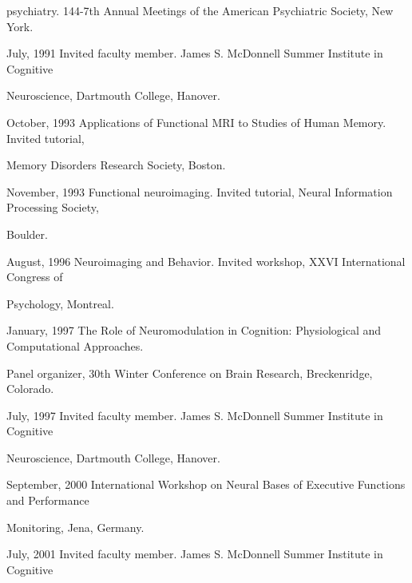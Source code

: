 \documentclass[10 pt]{article}
\begin{document}
\hspace{1.1in} psychiatry. 144-7th Annual Meetings of the American Psychiatric Society, New York.

July, 1991 \hspace{0.44in} Invited faculty member. James S. McDonnell Summer Institute in Cognitive

\hspace{1.1in} Neuroscience, Dartmouth College, Hanover.

October, 1993 \hspace{0.2in} Applications of Functional MRI to Studies of Human Memory. Invited tutorial,

\hspace{1.1in} Memory Disorders Research Society, Boston.

November, 1993 \hspace{0.09in} Functional neuroimaging. Invited tutorial, Neural Information Processing Society,

\hspace{1.1in} Boulder.

August, 1996 \hspace{0.25in} Neuroimaging and Behavior. Invited workshop, XXVI International Congress of

\hspace{1.1in} Psychology, Montreal.

January, 1997 \hspace{0.23in} The Role of Neuromodulation in Cognition: Physiological and Computational Approaches.

\hspace{1.1in} Panel organizer, 30th Winter Conference on Brain Research, Breckenridge, Colorado.

July, 1997 \hspace{0.44in} Invited faculty member. James S. McDonnell Summer Institute in Cognitive

\hspace{1.1in} Neuroscience, Dartmouth College, Hanover.

September, 2000 \hspace{0.05in} International Workshop on Neural Bases of Executive Functions and Performance

\hspace{1.1in} Monitoring, Jena, Germany.

July, 2001 \hspace{0.44in} Invited faculty member. James S. McDonnell Summer Institute in Cognitive
\end{document}
